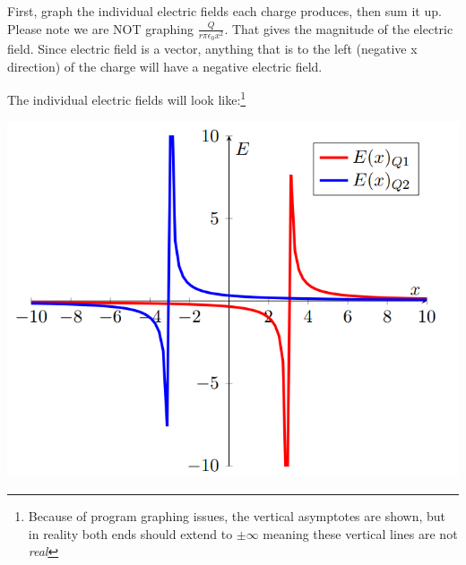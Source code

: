 \begin{solution}
First, graph the individual electric fields each charge produces, then sum it up. Please note we are NOT graphing $\frac{Q}{r\pi\epsilon_0x^2}$. That gives the magnitude of the electric field. Since electric field is a vector, anything that is to the left (negative x direction) of the charge will have a negative electric field.

The individual electric fields will look like:\footnote{Because of program graphing issues, the vertical asymptotes are shown, but in reality both ends should extend to $\pm \infty$ meaning these vertical lines are not \emph{real}}

\begin{center}


\includegraphics{Figures/Figure210}
\end{center}


\end{solution}
